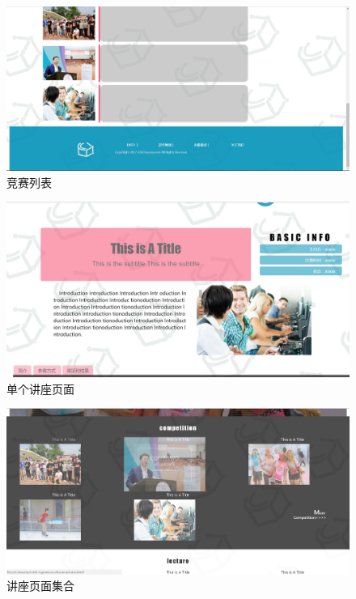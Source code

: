 \documentclass[UTF8]{ctexart}
\begin{document}
\begin{spacing}{1.3}
\begin{figure}[h]
    \centering
    \includegraphics[width=\textwidth]{images//images.JPG}
    \caption{竞赛列表}
    \label{fig:competition}
\end{figure}

\begin{figure}[h]
    \centering
    \includegraphics[width=\textwidth]{images//singleinfo.JPG}
    \caption{单个讲座页面}
    \label{fig:single}
\end{figure}

\begin{figure}[h]
    \centering
    \includegraphics[width=\textwidth]{images//comptetition.JPG}
    \caption{讲座页面集合}
    \label{fig:collection}
\end{figure}

\end{spacing}
\end{document}
